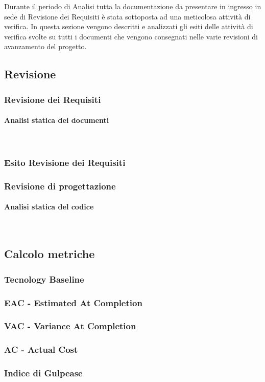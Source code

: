 Durante il periodo di Analisi tutta la documentazione da presentare in ingresso in sede di 
Revisione dei Requisiti è stata sottoposta ad una meticolosa attività di verifica. 
In questa sezione vengono descritti e analizzati gli esiti delle attività di verifica svolte su tutti i documenti che 
vengono consegnati nelle varie revisioni di avanzamento del progetto.

\subsection{Revisione}
\subsubsection{Revisione dei Requisiti}
\paragraph{Analisi statica dei documenti}\mbox{}\\


\subsubsection{Esito Revisione dei Requisiti}



\subsubsection{Revisione di progettazione}
\paragraph{Analisi statica del codice}\mbox{}\\



\subsection{Calcolo metriche}
\subsubsection{Tecnology Baseline}


\subsubsection{EAC - Estimated At Completion}

\subsubsection{VAC - Variance At Completion}

\subsubsection{AC - Actual Cost}

\subsubsection{Indice di Gulpease}


